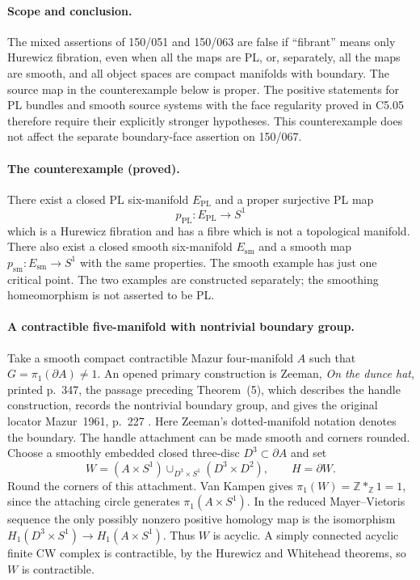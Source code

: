 \label{sec:C5H}

\paragraph{Scope and conclusion.}
The mixed assertions of 150/051 and 150/063 are false if
``fibrant'' means only Hurewicz fibration, even when all the maps are PL,
or, separately, all the maps are smooth, and all object spaces are compact
manifolds with boundary.  The source map in the counterexample below is
proper.  The positive statements for PL bundles and smooth source systems with the face regularity proved in C5.05
therefore require their explicitly stronger hypotheses.  This counterexample
does not affect the separate boundary-face assertion on 150/067.

\paragraph{The counterexample (proved).}
There exist a closed PL six-manifold $E_{\mathrm{PL}}$ and a proper
surjective PL map
\[
 p_{\mathrm{PL}}:E_{\mathrm{PL}}\longrightarrow S^1
\]
which is a Hurewicz fibration and has a fibre which is not a topological
manifold.  There also exist a closed smooth six-manifold $E_{\mathrm{sm}}$
and a smooth map $p_{\mathrm{sm}}:E_{\mathrm{sm}}\to S^1$ with the same
properties.  The smooth example has just one critical point.  The two
examples are constructed separately; the smoothing homeomorphism is not
asserted to be PL.

\paragraph{A contractible five-manifold with nontrivial boundary group.}
Take a smooth compact contractible Mazur four-manifold $A$ such that
$G=\pi_1(\partial A)\ne1$.  An opened primary construction is Zeeman,
\emph{On the dunce hat}, printed p.~347, the passage preceding Theorem~(5),
which describes the handle construction, records the nontrivial boundary
group, and gives the original locator Mazur~1961, p.~227
\cite[p.~347]{C5HZeeman1964}.  Here Zeeman's dotted-manifold notation denotes
the boundary.  The handle attachment can be made smooth and corners rounded.
Choose a smoothly embedded closed three-disc $D^3\subset\partial A$ and set
\[
 W=(A\times S^1)\mathop{\cup}_{D^3\times S^1}(D^3\times D^2),
 \qquad H=\partial W.
 \tag{C5H.1}
\]
Round the corners of this attachment.  Van Kampen gives
$\pi_1(W)=\mathbb Z*_{\mathbb Z}1=1$, since the attaching circle generates
$\pi_1(A\times S^1)$.  In the reduced Mayer--Vietoris sequence the only
possibly nonzero positive homology map is the isomorphism
$H_1(D^3\times S^1)\to H_1(A\times S^1)$.  Thus $W$ is acyclic.
A simply connected acyclic finite CW complex is contractible, by the
Hurewicz and Whitehead theorems, so $W$ is contractible.

